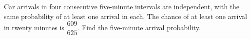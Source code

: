 Car arrivals in four consecutive five-minute intervals are independent, with the same probability of at least one arrival in each. The chance of at least one arrival in twenty minutes is $\dfrac{609}{625}$. Find the five-minute arrival probability.
